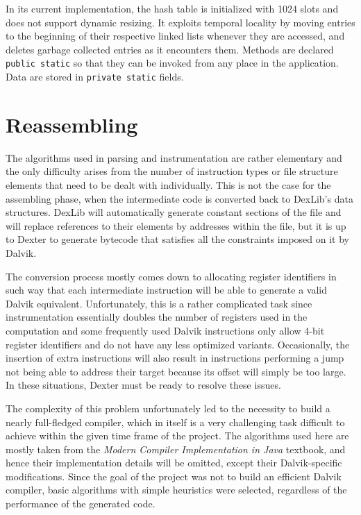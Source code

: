 \documentclass[12pt,twoside,notitlepage]{report}
\begin{document}
In its current implementation, the hash table is initialized with 1024 slots and does not support dynamic resizing. It exploits temporal locality by moving entries to the beginning of their respective linked lists whenever they are accessed, and deletes garbage collected entries as it encounters them. Methods are declared \verb$public static$ so that they can be invoked from any place in the application. Data are stored in \verb$private static$ fields.

\section{Reassembling}

The algorithms used in parsing and instrumentation are rather elementary and the only difficulty arises from the number of instruction types or file structure elements that need to be dealt with individually. This is not the case for the assembling phase, when the intermediate code is converted back to DexLib's data structures. DexLib will automatically generate constant sections of the file and will replace references to their elements by addresses within the file, but it is up to Dexter to generate bytecode that satisfies all the constraints imposed on it by Dalvik. 

The conversion process mostly comes down to allocating register identifiers in such way that each intermediate instruction will be able to generate a valid Dalvik equivalent. Unfortunately, this is a rather complicated task since instrumentation essentially doubles the number of registers used in the computation and some frequently used Dalvik instructions only allow 4-bit register identifiers and do not have any less optimized variants. Occasionally, the insertion of extra instructions will also result in instructions performing a jump not being able to address their target because its offset will simply be too large. In these situations, Dexter must be ready to resolve these issues.

The complexity of this problem unfortunately led to the necessity to build a nearly full-fledged compiler, which in itself is a very challenging task difficult to achieve within the given time frame of the project.  The algorithms used here are mostly taken from the \emph{Modern Compiler Implementation in Java} textbook, and hence their implementation details will be omitted, except their Dalvik-specific modifications. Since the goal of the project was not to build an efficient Dalvik compiler, basic algorithms with simple heuristics were selected, regardless of the performance of the generated code. 
\end{document}
